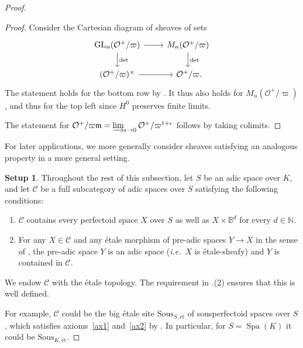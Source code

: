 \documentclass[11pt]{amsart}
\numberwithin{equation}{section}
\theoremstyle{definition}
\newtheorem{Setup}[thm]{Setup}
\theoremstyle{remark}
\newcommand{\B}{\mathbb{B}}
\newcommand{\N}{\mathbb{N}}
\renewcommand{\O}{\mathcal{O}}
\newcommand{\m}{\mathfrak{m}}
\newcommand{\GL}{\operatorname{GL}}
\newcommand{\Spa}{\operatorname{Spa}}
\newcommand{\et}{{\operatorname{\acute{e}t}}}
\newcommand{\Sous}{\mathrm{Sous}}
\begin{document}
\begin{proof}
        \begin{proof}
		Consider the Cartesian diagram of sheaves of sets
		\[\begin{tikzcd}
			\GL_n(\O^+/\varpi) \arrow[d,"\det"] \arrow[r] & M_n(\O^+/\varpi) \arrow[d,"\det"] \\
			(\O^+/\varpi)^\times \arrow[r] & \O^+/\varpi\rlap{.}
		\end{tikzcd}\]
		The statement holds for the bottom row by \cite[Lemma 3.10]{heuer-diamantine-Picard}. It thus also holds for $M_n(\O^+/\varpi)$, and thus for the top left since $H^0$ preserves finite limits.
		
		The statement for $\O^+/\varpi\m=\varinjlim_{\epsilon\to 0} \O^+/\varpi^{1+\epsilon}$ follows by taking colimits.
	\end{proof}
	
	For later applications, we more generally consider sheaves satisfying an analogous property in a more general setting. 
	
	\begin{Setup}\label{setup}
		Throughout the rest of this subsection, let $S$ be an adic space over $K$, and let $\mathcal C$ be a full subcategory of  adic spaces over $S$ satisfying the following conditions:
	\begin{enumerate}
		\item\label{ax1} $\mathcal C$ contains every perfectoid space $X$ over $S$ as well as $X\times \B^d$ for every $d\in \N$.
		\item\label{ax2} For any $X\in \mathcal C$ and any \'etale morphism of pre-adic spaces $Y\to X$ in the sense of \cite[Definition 8.2.16]{KedlayaLiu-rel-p-p-adic-Hodge-I}, the pre-adic space $Y$ is an adic space (\textit{i.e.}~$X$ is \'etale-sheafy) and $Y$ is contained in $\mathcal C$.
	\end{enumerate}
	We endow $\mathcal C$ with the \'etale topology.
	The requirement in .(2)
        ensures that this is well defined.
	\end{Setup}

        For example, $\mathcal C$ could be the big \'etale site $\Sous_{S,\et}$ of sousperfectoid spaces over $S$, which satisfies axioms~\eqref{ax1} and~\eqref{ax2} by \cite[Proposition 6.3.3]{ScholzeBerkeleyLectureNotes}. In particular, for $S=\Spa(K)$ it could be $\Sous_{K,\et}$.


\end{proof}
\end{document}
